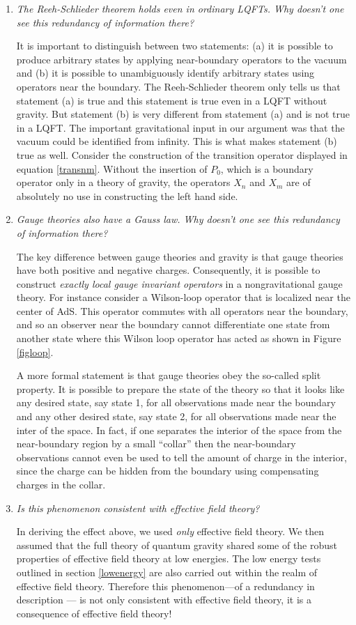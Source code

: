 \documentclass[12pt]{article}
\def\projvac{{\cal P}_{\Omega}}
\def\projvac{P_0}
\begin{document}
\begin{enumerate}[qseries]
\item
{\em The Reeh-Schlieder theorem holds even in ordinary LQFTs. Why doesn't one see this redundancy of information there?}

It is important to distinguish between two statements: (a) it is possible to produce arbitrary states by applying near-boundary operators to the vacuum and (b) it is possible to unambiguously identify arbitrary states
using operators near the boundary. The Reeh-Schlieder theorem only tells us that statement (a) is true and this statement is true even in a LQFT without gravity. But statement (b) is very different from statement (a) and is not true in a LQFT. The important gravitational input in our argument was that the vacuum could be identified from infinity. This is what makes statement (b) true as well. Consider the construction of the transition operator displayed in equation \eqref{transnm}. Without the insertion of $\projvac$, which is a boundary operator only in a theory of gravity, the operators $X_n$ and $X_m$ are of absolutely no use in constructing the left hand side.
\item
{\em Gauge theories also have a Gauss law. Why doesn't one see this redundancy of information there?}

The key difference between gauge theories and gravity is that gauge theories have both positive and negative charges. Consequently, it is possible to construct {\em exactly local gauge invariant operators} in a nongravitational
gauge theory. For instance consider a Wilson-loop operator that is localized near the center of AdS. This operator commutes with all operators near the boundary, and so an observer near the boundary cannot differentiate one state
from another state where this Wilson loop operator has acted as shown in Figure \ref{figloop}.

A more formal statement is that gauge theories obey the so-called split property. It is possible to prepare the state of the theory so that it looks like any desired state, say state 1, for all observations made near the boundary
and any other desired state, say state 2, for all observations made near the inter of the space. In fact, if one separates the interior of the space from the near-boundary region by a small ``collar'' then the near-boundary observations cannot even be used to tell the amount of charge in the interior, since the charge can be hidden from the boundary using compensating charges in the collar.
\item
{\em Is this phenomenon consistent with effective field theory?}

In deriving the effect above, we used {\em only} effective field theory. We then  assumed that the full theory of quantum gravity shared some of the robust properties of effective field theory at low energies.  The low energy tests outlined in section \ref{lowenergy} are also carried out within the realm of effective field theory.  Therefore this phenomenon---of a redundancy in description --- is not only consistent with effective field theory, it is a consequence of effective field theory!



\end{enumerate}
\end{document}
